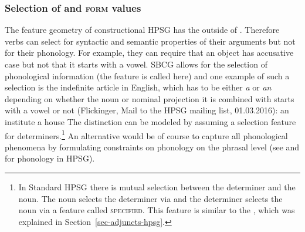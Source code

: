 

\subsubsection{Selection of \phon and \textsc{form} values}

The feature geometry of constructional HPSG has the \phonv outside of \synsem. Therefore verbs can
select for syntactic and semantic properties of their arguments but not for their phonology. For
example, they can require that an object has accusative case but not that it starts with a
vowel. SBCG allows for the selection of phonological information (the feature is called \form here)
and one example of such a selection is the indefinite article in English, which has to be either \emph{a} or
\emph{an} depending on whether the noun or nominal projection it is combined with starts with a
vowel or not (Flickinger, Mail to the HPSG mailing list, 01.03.2016):
\eal
\ex an institute
\ex a  house
\zl
The distinction can be modeled by assuming a selection feature for determiners.\footnote{%
  In Standard HPSG there is mutual selection between the determiner and the noun. The noun selects
  the determiner via \spr and the determiner selects the noun via a feature called
  \textsc{specified}. This feature is similar to the \modf, which was explained in Section~\ref{sec-adjuncts-hpsg}.
} An alternative would be of course to capture all phonological phenomena by formulating constraints on phonology on the
phrasal level (see \citealp{BK94b} and \citealp{Walther99a-u} for phonology in HPSG).

